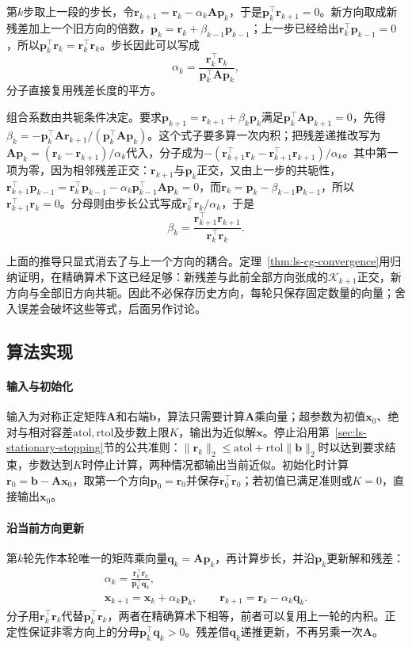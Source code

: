 第$k$步取上一段的步长，令$\bm r_{k+1}=\bm r_k-\alpha_k\bm A\bm p_k$，于是$\bm p_k^\top\bm r_{k+1}=0$。新方向取成新残差加上一个旧方向的倍数，$\bm p_k=\bm r_k+\beta_{k-1}\bm p_{k-1}$；上一步已经给出$\bm r_k^\top\bm p_{k-1}=0$，所以$\bm p_k^\top\bm r_k=\bm r_k^\top\bm r_k$。步长因此可以写成
\[
 \alpha_k=\frac{\bm r_k^\top\bm r_k}{\bm p_k^\top\bm A\bm p_k},
\]
分子直接复用残差长度的平方。

组合系数由共轭条件决定。要求$\bm p_{k+1}=\bm r_{k+1}+\beta_k\bm p_k$满足$\bm p_k^\top\bm A\bm p_{k+1}=0$，先得$\beta_k=-\bm p_k^\top\bm A\bm r_{k+1}/(\bm p_k^\top\bm A\bm p_k)$。这个式子要多算一次内积；把残差递推改写为$\bm A\bm p_k=(\bm r_k-\bm r_{k+1})/\alpha_k$代入，分子成为$-(\bm r_{k+1}^\top\bm r_k-\bm r_{k+1}^\top\bm r_{k+1})/\alpha_k$。其中第一项为零，因为相邻残差正交：$\bm r_{k+1}$与$\bm p_k$正交，又由上一步的共轭性，$\bm r_{k+1}^\top\bm p_{k-1}=\bm r_k^\top\bm p_{k-1}-\alpha_k\bm p_{k-1}^\top\bm A\bm p_k=0$，而$\bm r_k=\bm p_k-\beta_{k-1}\bm p_{k-1}$，所以$\bm r_{k+1}^\top\bm r_k=0$。分母则由步长公式写成$\bm r_k^\top\bm r_k/\alpha_k$，于是
\[
 \beta_k=\frac{\bm r_{k+1}^\top\bm r_{k+1}}{\bm r_k^\top\bm r_k}.
\]

上面的推导只显式消去了与上一个方向的耦合。定理~\ref{thm:ls-cg-convergence}用归纳证明，在精确算术下这已经足够：新残差与此前全部方向张成的$\mathcal K_{k+1}$正交，新方向与全部旧方向共轭。因此不必保存历史方向，每轮只保存固定数量的向量；舍入误差会破坏这些等式，后面另作讨论。

\subsection{算法实现}

\paragraph{输入与初始化}
输入为对称正定矩阵$\bm A$和右端$\bm b$，算法只需要计算$\bm A$乘向量；超参数为初值$\bm x_0$、绝对与相对容差$\mathrm{atol},\mathrm{rtol}$及步数上限$K$，输出为近似解$\bm x$。停止沿用第~\ref{sec:ls-stationary-stopping}节的公共准则：$\lVert\bm r_k\rVert_2\le\mathrm{atol}+\mathrm{rtol}\lVert\bm b\rVert_2$时以达到要求结束，步数达到$K$时停止计算，两种情况都输出当前近似。初始化时计算$\bm r_0=\bm b-\bm A\bm x_0$，取第一个方向$\bm p_0=\bm r_0$并保存$\bm r_0^\top\bm r_0$；若初值已满足准则或$K=0$，直接输出$\bm x_0$。

\paragraph{沿当前方向更新}
第$k$轮先作本轮唯一的矩阵乘向量$\bm q_k=\bm A\bm p_k$，再计算步长，并沿$\bm p_k$更新解和残差：
\[
 \begin{gathered}
 \alpha_k=\frac{\bm r_k^\top\bm r_k}{\bm p_k^\top\bm q_k},\\
 \bm x_{k+1}=\bm x_k+\alpha_k\bm p_k,\qquad
 \bm r_{k+1}=\bm r_k-\alpha_k\bm q_k .
 \end{gathered}
\]
分子用$\bm r_k^\top\bm r_k$代替$\bm p_k^\top\bm r_k$，两者在精确算术下相等，前者可以复用上一轮的内积。正定性保证非零方向上的分母$\bm p_k^\top\bm q_k>0$。残差借$\bm q_k$递推更新，不再另乘一次$\bm A$。

